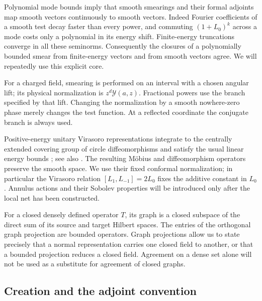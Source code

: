 Polynomial mode bounds imply that smooth smearings and their formal adjoints map smooth vectors continuously to smooth vectors. Indeed Fourier coefficients of a smooth test decay faster than every power, and commuting $(1+L_0)^k$ across a mode costs only a polynomial in its energy shift. Finite-energy truncations converge in all these seminorms. Consequently the closures of a polynomially bounded smear from finite-energy vectors and from smooth vectors agree. We will repeatedly use this explicit core.

For a charged field, smearing is performed on an interval with a chosen angular lift; its physical normalization is $z^d\mathcal Y(a,z)$. Fractional powers use the branch specified by that lift. Changing the normalization by a smooth nowhere-zero phase merely changes the test function. At a reflected coordinate the conjugate branch is always used.

Positive-energy unitary Virasoro representations integrate to the centrally extended covering group of circle diffeomorphisms and satisfy the usual linear energy bounds \cite[Proposition~3.2, Remark~3.3 and Theorem~3.4]{CKLW}; see also \cite[Theorem~5.2.1 and Proposition~5.3.1]{ToledanoLaredo}. The resulting M\"obius and diffeomorphism operators preserve the smooth space. We use their fixed conformal normalization; in particular the Virasoro relation $[L_1,L_{-1}]=2L_0$ fixes the additive constant in $L_0$. Annulus actions and their Sobolev properties will be introduced only after the local net has been constructed.

For a closed densely defined operator $T$, its graph is a closed subspace of the direct sum of its source and target Hilbert spaces. The entries of the orthogonal graph projection are bounded operators. Graph projections allow us to state precisely that a normal representation carries one closed field to another, or that a bounded projection reduces a closed field. Agreement on a dense set alone will not be used as a substitute for agreement of closed graphs.

\subsection{Creation and the adjoint convention}

